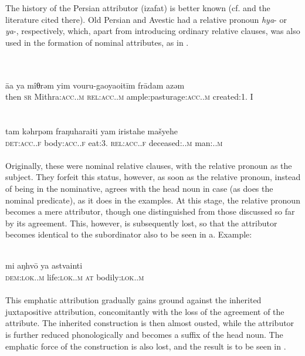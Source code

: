 The history of the Persian attributor (izafat) is better known (cf. \citealt[Ch.~\textsc{vi}.3]{Lehmann1984} and the literature cited there). Old Persian and Avestic had a relative pronoun \textit{hya}{}- or \textit{ya}{}-, respectively, which, apart from introducing ordinary relative clauses, was also used in the formation of nominal attributes, as in .

\ea\label{ex:E41}
\langinfo{\LangAvest}{}{} \\
\ea
{}\\ 
\gll \=aa  ya  mîθrəm  yim  vouru-gaoyaoit\=im fr\=adam  azəm\\
then  \textsc{sr}  Mithra:\textsc{acc}.\glsg.\textsc{m}  \textsc{rel}:\textsc{acc}.\glsg.\textsc{m}  ample:pasturage:\textsc{acc}.\glsg.\textsc{m} {created:1.\glsg}  I\\
\\
\ex
{}\\
\gll  tam  kəhrpəm  fraŋuharaiti yam  iristahe  mašyehe\\
   \textsc{det}:\textsc{acc}.\glsg.\textsc{f}  body:\textsc{acc}.\glsg.\textsc{f}  {eat:3.\glsg}    \textsc{rel}:\textsc{acc}.\glsg.\textsc{f}  deceased:\glgen.\glsg.\textsc{m}  man:\glgen.\glsg.\textsc{m}\\
\\
\z
\z
\noindent Originally, these were nominal relative clauses, with the relative pronoun as the subject. They forfeit this status, however, as soon as the relative pronoun, instead of being in the nominative, agrees with the head noun in case (as does the nominal predicate), as it does in the examples. At this stage, the relative pronoun becomes a mere attributor, though one distinguished from those discussed so far by its agreement. This, however, is subsequently lost, so that the attributor becomes identical to the subordinator also to be seen in a. Example:

\ea\label{ex:E42}
\\
 \gll mi  aŋhv\=o  ya  astvainti\\
 \textsc{dem}:\textsc{lok}.\glsg.\textsc{m}  life:\textsc{lok}.\glsg.\textsc{m}  \textsc{at}  bodily:\textsc{lok}.\glsg.\textsc{m}\\
\\
\z
\noindent This emphatic attribution gradually gains ground against the inherited juxtapositive attribution, concomitantly with the loss of the agreement of the attribute. The inherited construction is then almost ousted, while the attributor is further reduced phonologically and becomes a suffix of the head noun. The emphatic force of the construction is also lost, and the result is to be seen in .


